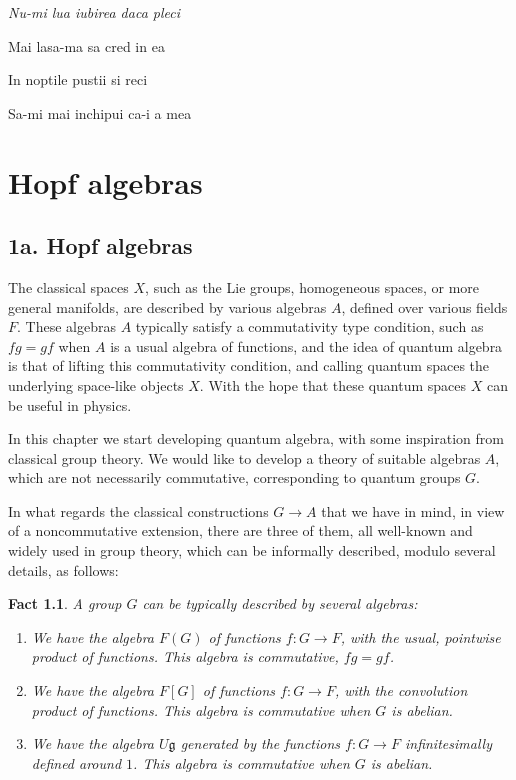 \documentclass[12pt]{amsbook}
\newtheorem{fact}[theorem]{Fact}
\begin{document}
\begin{center}
{\em Nu-mi lua iubirea daca pleci

Mai lasa-ma sa cred in ea

In noptile pustii si reci

Sa-mi mai inchipui ca-i a mea}
\end{center}

\chapter{Hopf algebras}

\section*{1a. Hopf algebras}

The classical spaces $X$, such as the Lie groups, homogeneous spaces, or more general manifolds, are described by various algebras $A$, defined over various fields $F$. These algebras $A$ typically satisfy a commutativity type condition, such as $fg=gf$ when $A$ is a usual algebra of functions, and the idea of quantum algebra is that of lifting this commutativity condition, and calling quantum spaces the underlying space-like objects $X$. With the hope that these quantum spaces $X$ can be useful in physics.

\bigskip

In this chapter we start developing quantum algebra, with some inspiration from classical group theory. We would like to develop a theory of suitable algebras $A$, which are not necessarily commutative, corresponding to quantum groups $G$. 

\bigskip 

In what regards the classical constructions $G\to A$ that we have in mind, in view of a noncommutative extension, there are three of them, all well-known and widely used in group theory, which can be informally described, modulo several details, as follows:


\begin{fact}
A group $G$ can be typically described by several algebras:
\begin{enumerate}
\item We have the algebra $F(G)$ of functions $f:G\to F$, with the usual, pointwise product of functions. This algebra is commutative, $fg=gf$.

\item We have the algebra $F[G]$ of functions $f:G\to F$, with the convolution product of functions. This algebra is commutative when $G$ is abelian.

\item We have the algebra $U\mathfrak g$ generated by the functions $f:G\to F$ infinitesimally defined around $1$. This algebra is commutative when $G$ is abelian.
\end{enumerate}
\end{fact}
\end{document}
